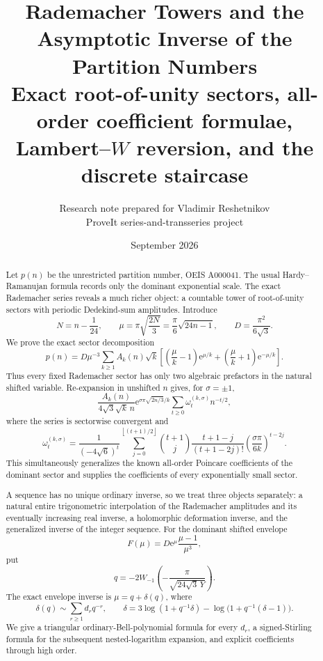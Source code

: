 \documentclass[11pt]{article}
\title{\vspace{-2.0em}\textbf{Rademacher Towers and the Asymptotic Inverse of the Partition Numbers}\\[0.35em]
\large Exact root-of-unity sectors, all-order coefficient formulae, Lambert--\(W\) reversion, and the discrete staircase}
\author{Research note prepared for Vladimir Reshetnikov\\
\small ProveIt series-and-transseries project}
\date{September 2026}
\numberwithin{equation}{section}
\theoremstyle{mainthm}
\theoremstyle{defstyle}
\theoremstyle{remark}
\newcommand{\e}{\mathrm e}
\newcommand{\floor}[1]{\left\lfloor#1\right\rfloor}
\begin{document}
\maketitle

\begin{abstract}
Let \(p(n)\) be the unrestricted partition number, OEIS A000041.  The usual Hardy--Ramanujan formula records only the dominant exponential scale.  The exact Rademacher series reveals a much richer object: a countable tower of root-of-unity sectors with periodic Dedekind-sum amplitudes.  Introduce
\[
 N=n-\frac1{24},\qquad
 \mu=\pi\sqrt{\frac{2N}{3}}=\frac{\pi}{6}\sqrt{24n-1},
 \qquad D=\frac{\pi^2}{6\sqrt3}.
\]
We prove the exact sector decomposition
\[
 p(n)=D\mu^{-3}\sum_{k\ge1}A_k(n)\sqrt{k}
 \left[\left(\frac\mu k-1\right)\e^{\mu/k}
       +\left(\frac\mu k+1\right)\e^{-\mu/k}\right].
\]
Thus every fixed Rademacher sector has only two algebraic prefactors in the natural shifted variable.  Re-expansion in unshifted \(n\) gives, for \(\sigma=\pm1\),
\[
 \frac{A_k(n)}{4\sqrt3\sqrt{k}\,n}\e^{\sigma\pi\sqrt{2n/3}/k}
 \sum_{t\ge0}\omega_t^{(k,\sigma)}n^{-t/2},
\]
where the series is sectorwise convergent and
\[
 \omega_t^{(k,\sigma)}=
 \frac{1}{(-4\sqrt6)^t}
 \sum_{j=0}^{\floor{(t+1)/2}}
 \binom{t+1}{j}\frac{t+1-j}{(t+1-2j)!}
 \left(\frac{\sigma\pi}{6k}\right)^{t-2j}.
\]
This simultaneously generalizes the known all-order Poincare coefficients of the dominant sector and supplies the coefficients of every exponentially small sector.

A sequence has no unique ordinary inverse, so we treat three objects separately: a natural entire trigonometric interpolation of the Rademacher amplitudes and its eventually increasing real inverse, a holomorphic deformation inverse, and the generalized inverse of the integer sequence.  For the dominant shifted envelope
\[
 F(\mu)=D\e^\mu\frac{\mu-1}{\mu^3},
\]
put
\[
 q=-2W_{-1}\!\left(-\frac{\pi}{\sqrt{24\sqrt3\,Y}}\right).
\]
The exact envelope inverse is \(\mu=q+\delta(q)\), where
\[
 \delta(q)\sim\sum_{r\ge1}d_rq^{-r},\qquad
 \delta=3\log(1+q^{-1}\delta)
        -\log\bigl(1+q^{-1}(\delta-1)\bigr).
\]
We give a triangular ordinary-Bell-polynomial formula for every \(d_r\), a signed-Stirling formula for the subsequent nested-logarithm expansion, and explicit coefficients through high order.


\end{abstract}
\end{document}

